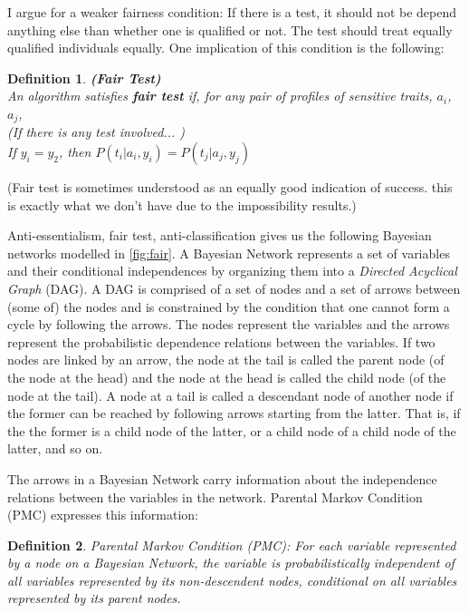 \documentclass{article}
\newtheorem{definition}{Definition}
\begin{document}
I argue for a weaker fairness condition: If there is a test, it should not be depend anything else than whether one is qualified or not. The test should treat equally qualified individuals equally. One implication of this condition is the following:

\begin{definition}
  \textup{\textbf{ (Fair Test) } \\
  \indent
  An algorithm satisfies \textbf{fair test} if, for any pair of profiles of sensitive traits}, $a_i$,  $a_j$, \\
  (If there is any test involved... )
  \\
  
  \textup{If } $y_i = y_2$\textup{, then } $P(t_i|a_i, y_i) = P(t_j|a_j, y_j)$
  \end{definition}

(Fair test is sometimes understood as an equally good indication of success. this is exactly what we don't have due to the impossibility results.)

Anti-essentialism, fair test, anti-classification gives us the following Bayesian networks modelled in \ref{fig:fair}. A Bayesian Network represents a set of variables and their conditional independences by organizing them into a \textit{Directed Acyclical Graph} (DAG).  A DAG is comprised of a set of nodes and a set of arrows between (some of) the nodes and is constrained by the condition that one cannot form a cycle by following the arrows. The nodes represent the variables and the arrows represent the probabilistic dependence relations between the variables. If two nodes are linked by an arrow, the node at the tail is called the parent node (of the node at the head) and the node at the head is called the child node (of the node at the tail).  A node at a tail is called a descendant node of another node if the former can be reached by following arrows starting from the latter. That is, if the the former is a child node of the latter, or a child node of a child node of the latter, and so on. 

The arrows in a Bayesian Network carry information about the independence relations between the variables in the network. Parental Markov Condition (PMC) expresses this information:

\begin{definition}{Parental Markov Condition (PMC):}
\textup{For each variable represented by a node on a Bayesian Network, the variable is probabilistically independent of all variables represented by its non-descendent nodes, conditional on all variables represented by its parent nodes.}
\end{definition}
\end{document}
